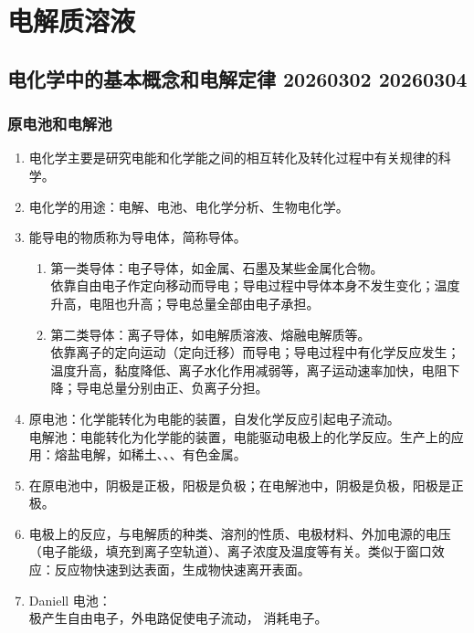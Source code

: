 \section{电解质溶液}

\subsection{电化学中的基本概念和电解定律 20260302 20260304}

\subsubsection{原电池和电解池}

\begin{enumerate}
    \item 电化学主要是研究电能和化学能之间的相互转化及转化过程中有关规律的科学。
    \item 电化学的用途：电解、电池、电化学分析、生物电化学。
    \item 能导电的物质称为导电体，简称导体。
    \begin{enumerate}
        \item 第一类导体：电子导体，如金属、石墨及某些金属化合物。 \\ 依靠自由电子作定向移动而导电；导电过程中导体本身不发生变化；温度升高，电阻也升高；导电总量全部由电子承担。
        \item 第二类导体：离子导体，如电解质溶液、熔融电解质等。 \\ 依靠离子的定向运动（定向迁移）而导电；导电过程中有化学反应发生；温度升高，黏度降低、离子水化作用减弱等，离子运动速率加快，电阻下降；导电总量分别由正、负离子分担。
    \end{enumerate}
    \item 原电池：化学能转化为电能的装置，自发化学反应引起电子流动。 \\ 电解池：电能转化为化学能的装置，电能驱动电极上的化学反应。生产上的应用：熔盐电解，如稀土、、、有色金属。 
    \item 在原电池中，阴极是正极，阳极是负极；在电解池中，阴极是负极，阳极是正极。
    \item 电极上的反应，与电解质的种类、溶剂的性质、电极材料、外加电源的电压（电子能级，填充到离子空轨道）、离子浓度及温度等有关。类似于窗口效应：反应物快速到达表面，生成物快速离开表面。
    \item Daniell 电池： \\  极产生自由电子，外电路促使电子流动， 消耗电子。

\end{enumerate}
